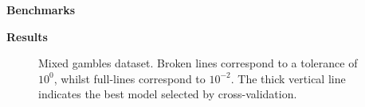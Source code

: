 \documentclass[french]{STIC_poster}
\begin{document}
\begin{frame}[t]
\begin{columns}[t]
\begin{column}{.48\linewidth}
\begin{nbox}[\textwidth]{\textbf{Benchmarks}}
\begin{nbox}{\textbf{Results}}
\begin{figure}
{                                Mixed gambles dataset. Broken lines correspond to a tolerance of $10^{0}$,
                                whilst full-lines correspond to $10^{-2}$. The thick vertical line
                                indicates the best model selected by cross-validation.}
                              \label{Fig:MSEtimes}
                            \end{figure}
                            \end{nbox}
				\end{nbox}
			\end{column}
			\hfill
		\end{columns}
	\end{frame}

 
\end{document}
